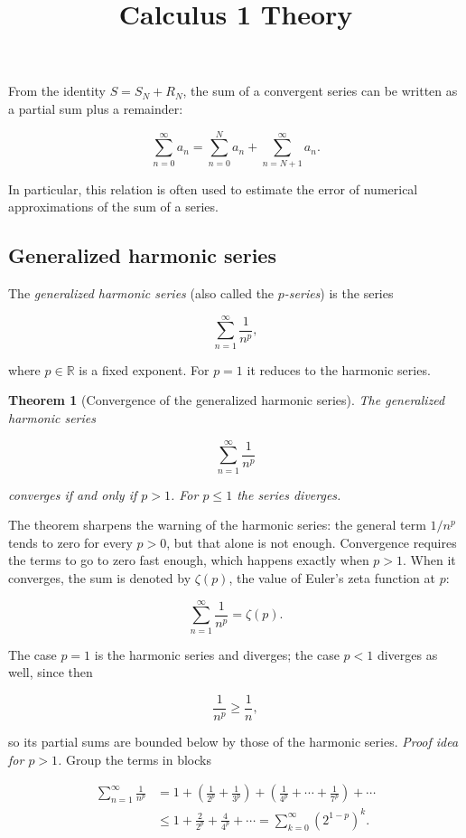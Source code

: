 \documentclass[11pt,a4paper]{article} \usepackage[T1]{fontenc}
\theoremstyle{plain} \newtheorem{theorem}{Theorem} \title{Calculus 1 Theory}
\begin{document}
From the identity $S = S_N + R_N$, the sum of a convergent series can be
written as a partial sum plus a remainder:

\[
\sum_{n=0}^{\infty} a_n = \sum_{n=0}^{N} a_n + \sum_{n=N+1}^{\infty} a_n.
\]

In particular, this relation is often used to estimate the error of numerical
approximations of the sum of a series.

\subsection {Generalized harmonic series}

The \emph{generalized harmonic series} (also called the \emph{$p$-series}) is
the series

\[
\sum_{n=1}^{\infty} \frac{1}{n^p},
\]

where $p\in\mathbb{R}$ is a fixed exponent. For $p=1$ it reduces to the
harmonic series.

\begin{theorem}
[Convergence of the generalized harmonic series] The generalized harmonic
series

\[
\sum_{n=1}^{\infty} \frac{1}{n^p}
\]

converges if and only if $p>1$. For $p\le 1$ the series diverges.
\end{theorem}

The theorem sharpens the warning of the harmonic series: the general term
$1/n^p$ tends to zero for every $p>0$, but that alone is not enough.
Convergence requires the terms to go to zero fast enough, which happens exactly
when $p>1$. When it converges, the sum is denoted by $\zeta(p)$, the value of
Euler's zeta function at $p$:

\[
\sum_{n=1}^{\infty} \frac{1}{n^p} = \zeta(p).
\]

The case $p=1$ is the harmonic series and diverges; the case $p<1$ diverges as
well, since then

\[
\frac{1}{n^p} \ge \frac{1}{n},
\]

so its partial sums are bounded below by those of the harmonic series.
\emph{Proof idea for $p>1$.} Group the terms in blocks

\[

\begin{aligned}
\sum_{n=1}^{\infty} \frac{1}{n^p} &= 1 + \left(\frac{1}{2^p}+\frac{1}{3^p}\right) + \left(\frac{1}{4^p}+\cdots+\frac{1}{7^p}\right) + \cdots \\ &\le 1 + \frac{2}{2^p} + \frac{4}{4^p} + \cdots
= \sum_{k=0}^{\infty} \left(2^{1-p}\right)^k.
\end{aligned}

\]
\end{document}
